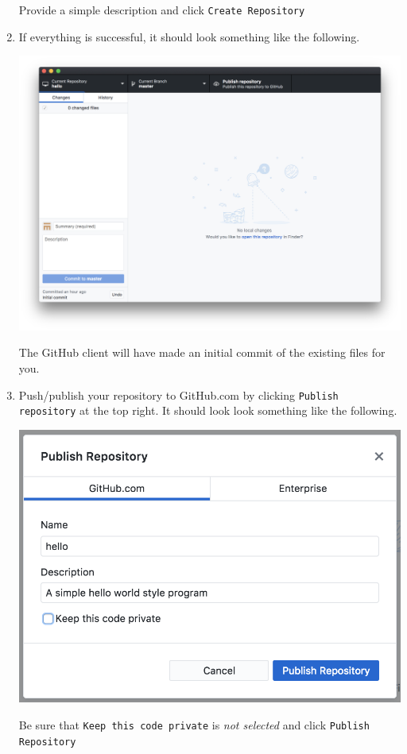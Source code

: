 \documentclass[12pt]{scrartcl}
\begin{document}
\begin{enumerate}
\begin{center}
  \end{center}
  Provide a simple description and click \texttt{Create Repository}

  \item If everything is successful, it should look something like the following.
  \begin{center}
  \includegraphics[scale=0.125]{./hack1.0-files/postCreation.png}
  \end{center}
  The GitHub client will have made an initial commit of the existing
  files for you.

  \item Push/publish your repository to GitHub.com by clicking 
  \texttt{Publish repository} at the top right.  It 
  should look look something like the following.  
  \begin{center}
  \includegraphics[scale=0.35]{./hack1.0-files/publish.png}
  \end{center}
  Be sure that \texttt{Keep this code private} is 
  \emph{not selected} and click \texttt{Publish Repository}
  

\end{enumerate}
\end{document}
